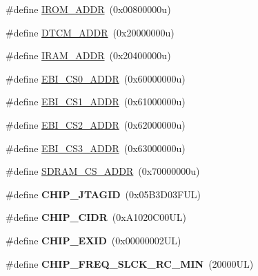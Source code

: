 \begin{DoxyCompactItemize}
\item 
\#define \mbox{\hyperlink{group__SAME70Q20__definitions_ga694212ffb8c2786bacee3d0ad6020bda}{I\+R\+O\+M\+\_\+\+A\+D\+DR}}~(0x00800000u)
\item 
\#define \mbox{\hyperlink{group__SAME70Q20__definitions_ga26626a425f7ebb3a0c2dbc276f0d9f78}{D\+T\+C\+M\+\_\+\+A\+D\+DR}}~(0x20000000u)
\item 
\#define \mbox{\hyperlink{group__SAME70Q20__definitions_gaae45ac2ef16942159481c767ac4805cf}{I\+R\+A\+M\+\_\+\+A\+D\+DR}}~(0x20400000u)
\item 
\#define \mbox{\hyperlink{group__SAME70Q20__definitions_ga9bcbb97ddae3b2cc5e2c9613d33f66b4}{E\+B\+I\+\_\+\+C\+S0\+\_\+\+A\+D\+DR}}~(0x60000000u)
\item 
\#define \mbox{\hyperlink{group__SAME70Q20__definitions_gaaddd9fdbbc77c9aced5308819f502a26}{E\+B\+I\+\_\+\+C\+S1\+\_\+\+A\+D\+DR}}~(0x61000000u)
\item 
\#define \mbox{\hyperlink{group__SAME70Q20__definitions_ga058a35f9991487dc2dd12ada792d0730}{E\+B\+I\+\_\+\+C\+S2\+\_\+\+A\+D\+DR}}~(0x62000000u)
\item 
\#define \mbox{\hyperlink{group__SAME70Q20__definitions_gad66ebdd0fc33ec3cf85dbaa14bbf05d9}{E\+B\+I\+\_\+\+C\+S3\+\_\+\+A\+D\+DR}}~(0x63000000u)
\item 
\#define \mbox{\hyperlink{group__SAME70Q20__definitions_ga61b7db25daf759c2a2beb6e5a0b57a84}{S\+D\+R\+A\+M\+\_\+\+C\+S\+\_\+\+A\+D\+DR}}~(0x70000000u)
\item 
\mbox{\label{group__SAME70Q20__definitions_gaa614519778eec0df55d3eeab3223e3f6}} 
\#define {\bfseries C\+H\+I\+P\+\_\+\+J\+T\+A\+G\+ID}~(0x05\+B3\+D03\+F\+U\+L)
\item 
\mbox{\label{group__SAME70Q20__definitions_ga1e1ae44dd9269a8a98c1d7e7a60e9fbd}} 
\#define {\bfseries C\+H\+I\+P\+\_\+\+C\+I\+DR}~(0x\+A1020\+C00\+U\+L)
\item 
\mbox{\label{group__SAME70Q20__definitions_ga35123717aa86b76bb6b73cf3adc4c2e6}} 
\#define {\bfseries C\+H\+I\+P\+\_\+\+E\+X\+ID}~(0x00000002\+U\+L)
\item 
\mbox{\label{group__SAME70Q20__definitions_ga0e868bf27426399dfdcb3a9dfc3733c4}} 
\#define {\bfseries C\+H\+I\+P\+\_\+\+F\+R\+E\+Q\+\_\+\+S\+L\+C\+K\+\_\+\+R\+C\+\_\+\+M\+IN}~(20000\+U\+L)

\end{DoxyCompactItemize}
